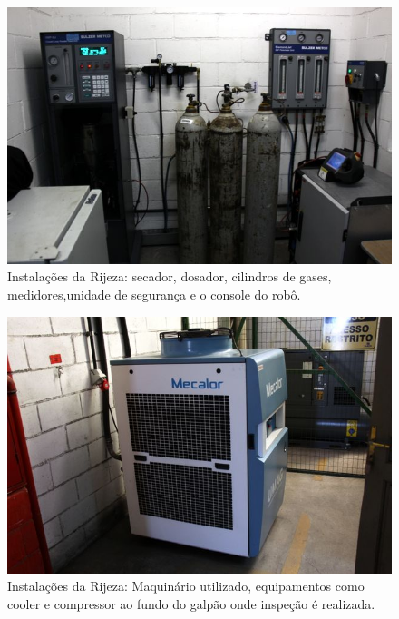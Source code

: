 \documentclass[a4paper,11pt,oneside,openany,brazilian,
version=last,draft=false,]{report}
\begin{document}
\begin{twocolumn}
% 


\begin{figure}[H]
\centering
\includegraphics[width=\columnwidth]{Fotos/img_4850.jpg}
\caption{Instalações da Rijeza: secador, dosador, cilindros de gases, medidores,unidade de segurança e o console do robô.}
\label{fig:gull}
\end{figure}
\begin{figure}[H]
\centering
\includegraphics[width=\columnwidth]{Fotos/img_4852.jpg}
\caption{Instalações da Rijeza: Maquinário utilizado, equipamentos como cooler e
compressor ao fundo do galpão onde inspeção é realizada.}
\end{figure}


\end{twocolumn}
\end{document}
